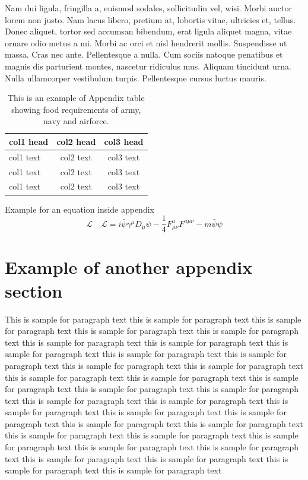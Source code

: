 \documentclass[APA,LATO1COL]{WileyNJD-v2}
\begin{document}
Nam dui ligula, fringilla a, euismod sodales, sollicitudin vel, wisi. Morbi auctor lorem non justo. Nam lacus libero,
pretium at, lobortis vitae, ultricies et, tellus. Donec aliquet, tortor sed accumsan bibendum, erat ligula aliquet magna,
vitae ornare odio metus a mi. Morbi ac orci et nisl hendrerit mollis. Suspendisse ut massa. Cras nec ante. Pellentesque
a nulla. Cum sociis natoque penatibus et magnis dis parturient montes, nascetur ridiculus mus. Aliquam tincidunt
urna. Nulla ullamcorper vestibulum turpis. Pellentesque cursus luctus mauris.

\begin{center}
\begin{table}[b]%
\centering
\caption{This is an example of Appendix table showing food requirements of army, navy and airforce.\label{tab4}}%
\begin{tabular*}{300pt}{@{\extracolsep\fill}lcc@{\extracolsep\fill}}%
\toprule
\textbf{col1 head} & \textbf{col2 head} & \textbf{col3 head} \\
\midrule
col1 text & col2 text & col3 text \\
col1 text & col2 text & col3 text \\
col1 text & col2 text & col3 text\\
\bottomrule
\end{tabular*}
\end{table}
\end{center}


Example for an equation inside appendix
\begin{equation}
\mathcal{L}\quad \mathbf{\mathcal{L}} = i \bar{\psi} \gamma^\mu D_\mu \psi - \frac{1}{4} F_{\mu\nu}^a F^{a\mu\nu} - m \bar{\psi} \psi\label{eq25}
\end{equation}

\section{Example of another appendix section\label{app3}}%

This is sample for paragraph text this is sample for paragraph text  this is sample for paragraph text this is sample for paragraph text this is sample for paragraph text this is sample for paragraph text this is sample for paragraph text this is sample for paragraph text this is sample for paragraph text this is sample for paragraph text this is sample for paragraph text this is sample for paragraph text this is sample for paragraph text this is sample for paragraph text this is sample for paragraph text this is sample for paragraph text this is sample for paragraph text this is sample for paragraph text this is sample for paragraph text this is sample for paragraph text this is sample for paragraph text this is sample for paragraph text this is sample for paragraph text this is sample for paragraph text this is sample for paragraph text this is sample for paragraph text this is sample for paragraph text this is sample for paragraph text this is sample for paragraph text this is sample for paragraph text this is sample for paragraph text this is sample for paragraph text this is sample for paragraph text
\end{document}
